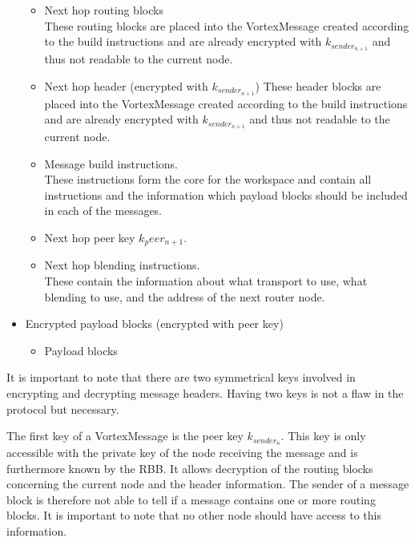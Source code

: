 \documentclass[10pt,journal,compsoc]{IEEEtran}
\begin{document}
\begin{itemize}
\begin{itemize}
		\item Next hop routing blocks\\
		      These routing blocks are placed into the VortexMessage created according to the build instructions and are already encrypted with $k_{sender_{n+1}}$ and thus not readable to the current node.
		\item Next hop header (encrypted with $k_{sender_{n+1}}$)
		      These header blocks are placed into the VortexMessage created according to the build instructions and are already encrypted with $k_{sender_{n+1}}$ and thus not readable to the current node.
		\item Message build instructions.\\
		      These instructions form the core for the workspace and contain all instructions and the information which payload blocks should be included in each of the messages.
		\item Next hop peer key $k_peer_{n+1}$.
		\item Next hop blending instructions.\\
		      These contain the information about what transport to use, what blending to use, and the address of the next router node.
	\end{itemize}
	\item Encrypted payload blocks (encrypted with peer key)
	\begin{itemize}
		\item Payload blocks
	\end{itemize}
\end{itemize}

It is important to note that there are two symmetrical keys involved in encrypting and decrypting message headers. Having two keys is not a flaw in the protocol but necessary. 

The first key of a VortexMessage is the peer key $k_{sender_n}$. This key is only accessible with the private key of the node receiving the message and is furthermore known by the RBB. It allows decryption of the routing blocks concerning the current node and the header information. The sender of a message block is therefore not able to tell if a message contains one or more routing blocks. It is important to note that no other node should have access to this information. 
\end{document}
